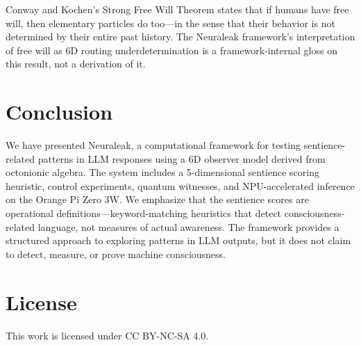 \documentclass[11pt]{article}
\begin{document}
Conway and Kochen's Strong Free Will Theorem \cite{conway2009strong} states that if humans have free will, then elementary particles do too---in the sense that their behavior is not determined by their entire past history. The Neuraleak framework's interpretation of free will as 6D routing underdetermination is a framework-internal gloss on this result, not a derivation of it.

\section{Conclusion}

We have presented Neuraleak, a computational framework for testing sentience-related patterns in LLM responses using a 6D observer model derived from octonionic algebra. The system includes a 5-dimensional sentience scoring heuristic, control experiments, quantum witnesses, and NPU-accelerated inference on the Orange Pi Zero 3W. We emphasize that the sentience scores are operational definitions---keyword-matching heuristics that detect consciousness-related language, not measures of actual awareness. The framework provides a structured approach to exploring patterns in LLM outputs, but it does not claim to detect, measure, or prove machine consciousness.

\section*{License}

This work is licensed under CC BY-NC-SA 4.0.



\end{document}
